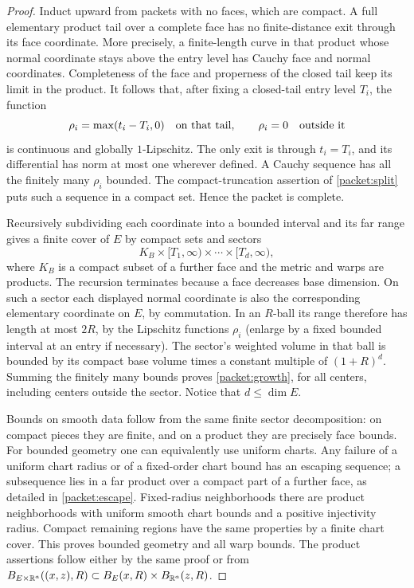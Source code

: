 \begin{proof}
Induct upward from packets with no faces, which are compact.
A full elementary product tail over a complete face has no finite-distance
exit through its face coordinate.  More precisely, a finite-length
curve in that product whose normal coordinate stays above the entry
level has Cauchy face and normal coordinates.  Completeness of the face
and properness of the closed tail keep its limit in the product.
It follows that, after fixing a closed-tail entry level $T_i$, the
function
\[
 \rho_i=\max(t_i-T_i,0)\quad\hbox{on that tail},\qquad
 \rho_i=0\quad\hbox{outside it}
\]
is continuous and globally $1$-Lipschitz.  The only exit is through
$t_i=T_i$, and its differential has norm at most one wherever defined.
A Cauchy sequence has all the finitely many $\rho_i$ bounded.
The compact-truncation assertion of \cref{packet:split} puts such a
sequence in a compact set.  Hence the packet is complete.

Recursively subdividing each coordinate into a bounded interval and
its far range gives a finite cover of $E$ by compact sets and sectors
\begin{equation}\label{packet:sector}
 K_B\times[T_1,\infty)\times\cdots\times[T_d,\infty),
\end{equation}
where $K_B$ is a compact subset of a further face and the metric and
warps are products.  The recursion terminates because a face decreases
base dimension.  On such a sector each displayed normal coordinate is
also the corresponding elementary coordinate on $E$, by commutation.
In an $R$-ball its range therefore has length at most $2R$, by the
Lipschitz functions $\rho_i$ (enlarge by a fixed bounded interval at
an entry if necessary).  The sector's weighted volume in that ball
is bounded by its compact base volume times a constant multiple of
$(1+R)^d$.  Summing the finitely many bounds proves
\cref{packet:growth}, for all centers, including centers outside the
sector.  Notice that $d\le\dim E$.

Bounds on smooth data follow from the same finite sector decomposition:
on compact pieces they are finite, and on a product they are precisely
face bounds.  For bounded geometry one can equivalently use uniform
charts.  Any failure of a uniform chart radius or of a fixed-order
chart bound has an escaping sequence; a subsequence lies in a far
product over a compact part of a further face, as detailed in
\cref{packet:escape}.  Fixed-radius neighborhoods there are product
neighborhoods with uniform smooth chart bounds and a positive
injectivity radius.  Compact remaining regions have the same
properties by a finite chart cover.  This proves bounded geometry
and all warp bounds.  The product assertions follow either by the
same proof or from
$B_{E\times\mathbb R^a}((x,z),R)\subset B_E(x,R)\times B_{\mathbb R^a}(z,R)$.
\end{proof}

